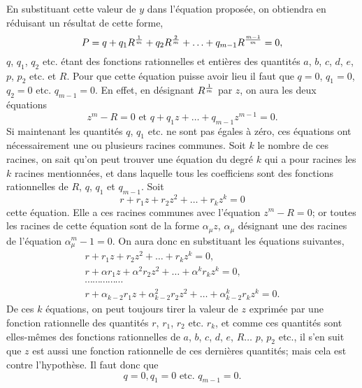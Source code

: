 \documentclass[oneside, 12 pt, leqno]{memoir}
\let\oldfrac\frac
\def\frac#1#2{\mathchoice{\text{\scalebox{.83}{${\oldfrac{#1}{#2}}$}}}{\text{\scalebox{.83}{${\displaystyle\oldfrac{#1}{#2}}$}}}{\genfrac{}{}{}{2}{#1}{#2}}{\genfrac{}{}{}{3}{#1}{#2}}}
\begin{document}
En substituant cette valeur de \(y\) dans l'équation proposée, on obtiendra en réduisant un résultat de cette forme,
\[P=q+q_1 R^{\frac{1}{m}}+q_2 R^{\frac{2}{m}}+\ldots+q_{m-1} R^{\frac{m-1}{m}}=0,\]
\(q\), \(q_1\), \(q_2\) etc. étant des fonctions rationnelles et entières des quantités \(a\), \(b\), \(c\), \(d\), \(e\), \(p\), \(p_2\) etc. et \(R\). Pour que cette équation puisse avoir lieu il faut que \(q=0\), \(q_1=0\), \(q_2=0\) etc. \(q_{m-1}=0\). En effet, en désignant \(R^{\frac{1}{m}}\) par \(z\), on aura les deux équations
\[z^m-R=0 \text { et } q+q_1 z+\ldots+q_{m-1} z^{m-1}=0.\]
Si maintenant les quantités \(q\), \(q_1\) etc. ne sont pas égales à zéro, ces équations ont nécessairement une ou plusieurs racines communes. Soit \(k\) le nombre de ces racines, on sait qu'on peut trouver une équation du degré \(k\) qui a pour racines les \(k\) racines mentionnées, et dans laquelle tous les coefficiens sont des fonctions rationnelles de \(R\), \(q\), \(q_1\) et \(q_{m-1}\). Soit
\[r+r_1 z+r_2 z^2+\ldots+r_k z^k=0\]
cette équation. Elle a ces racines communes avec l'équation \(z^m-R=0\); or toutes les racines de cette équation sont de la forme \(\alpha_\mu z\), \(\alpha_\mu\) désignant une des racines de l'équation \(\alpha_\mu^m-1=0\). On aura donc en substituant les équations suivantes,
\[\begin{gathered}
r+r_1 z+r_2 z^2+\ldots+r_k z^k=0,\\
r+\alpha r_1 z+\alpha^2 r_2 z^2+\ldots+\alpha^k r_k z^k=0,\\
\cdots \cdots \cdots \cdots \cdots \\
r+\alpha_{k-2} r_1 z+\alpha_{k-2}^2 r_2 z^2+\ldots+\alpha_{k-2}^k r_k z^k=0.
\end{gathered}\]
De ces \(k\) équations, on peut toujours tirer la valeur de \(z\) exprimée par une fonction rationnelle des quantités \(r\), \(r_1\), \(r_2\) etc. \(r_k\), et comme ces quantités sont elles-mêmes des fonctions rationnelles de \(a\), \(b\), \(c\), \(d\), \(e\), \(R \dots\) \(p\), \(p_2\) etc., il s'en suit que \(z\) est aussi une fonction rationnelle de ces dernières quantités; mais cela est contre l'hypothèse. Il faut donc que
\[q=0, q_1=0 \text { etc. } q_{m-1}=0.\]
\end{document}
